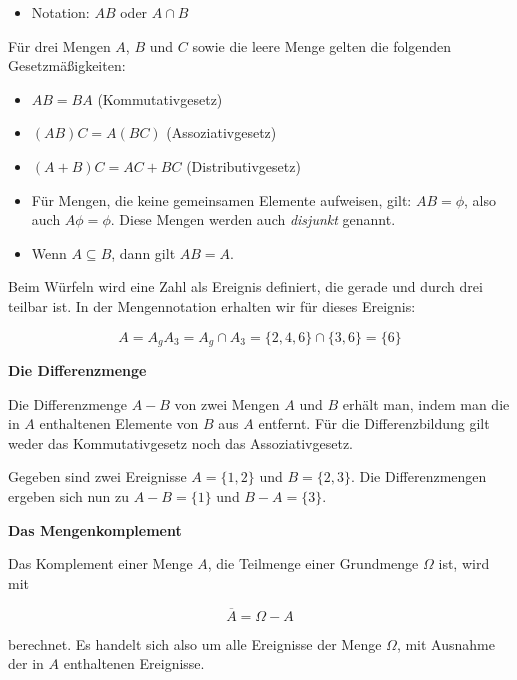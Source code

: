 \begin{itemize}
  \item Notation: $AB$ oder $A \cap B$
\end{itemize}

Für drei Mengen $A$, $B$ und $C$ sowie die leere Menge gelten die folgenden Gesetzmäßigkeiten:

\begin{itemize}
  \item $AB = BA$ \hfill (Kommutativgesetz)
  \item $(AB)C = A(BC)$ \hfill (Assoziativgesetz)
  \item $(A + B)C = AC + BC$ \hfill (Distributivgesetz)
  \item Für Mengen, die keine gemeinsamen Elemente aufweisen, gilt: $AB = \phi$, also auch $A\phi = \phi$. Diese Mengen werden auch \textit{disjunkt} genannt.
  \item Wenn $A \subseteq B$, dann gilt $AB = A$.
\end{itemize}


\begin{beispiel}[Schnittmenge]
Beim Würfeln wird eine Zahl als Ereignis definiert, die gerade und durch drei teilbar ist. In der Mengennotation erhalten wir für dieses Ereignis:

$$
A = A_g A_3 = A_g \cap A_3 = \{2,4,6\} \cap \{3,6\} = \{6\}
$$
\end{beispiel}

\textbf{Die Differenzmenge}

Die Differenzmenge $A - B$ von zwei Mengen $A$ und $B$ erhält man, indem man die in $A$ enthaltenen Elemente von $B$ aus $A$ entfernt. Für die Differenzbildung gilt weder das Kommutativgesetz noch das Assoziativgesetz.


\begin{beispiel}[Differenzmenge]
Gegeben sind zwei Ereignisse $A = \{1,2\}$ und $B = \{2,3\}$. Die Differenzmengen ergeben sich nun zu $A - B = \{1\}$ und $B - A = \{3\}$.
\end{beispiel}

\textbf{Das Mengenkomplement}

Das Komplement einer Menge $A$, die Teilmenge einer Grundmenge $\Omega$ ist, wird mit

$$
\overline{A} = \Omega - A
$$

berechnet. Es handelt sich also um alle Ereignisse der Menge $\Omega$, mit Ausnahme der in $A$ enthaltenen Ereignisse.

